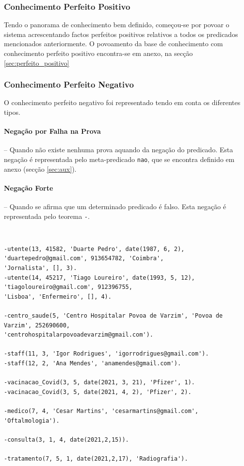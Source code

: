 \documentclass[a4paper, 11pt]{article}
\begin{document}
\subsubsection{Conhecimento Perfeito Positivo}

Tendo o panorama de conhecimento bem definido, começou-se por povoar o sistema acrescentando 
factos perfeitos positivos relativos a todos os predicados mencionados anteriormente. O povoamento 
da base de conhecimento com conhecimento perfeito positivo encontra-se em anexo, na secção 
\ref{sec:perfeito_positivo}

\subsubsection{Conhecimento Perfeito Negativo}

O conhecimento perfeito negativo foi representado tendo em
conta os diferentes tipos.

\paragraph{Negação por Falha na Prova} -- Quando não existe nenhuma prova aquando da negação 
do predicado. Esta negação é representada pelo meta-predicado \texttt{nao}, que se
encontra definido em anexo (secção \ref{sec:aux}).

\paragraph{Negação Forte} -- Quando se afirma que um determinado predicado é falso. Esta 
negação é representada pelo teorema \texttt{-}. 

\

\begin{lstlisting}[caption={Povoamento da base de conhecimento com conhecimento perfeito negativo}]
-utente(13, 41582, 'Duarte Pedro', date(1987, 6, 2), 'duartepedro@gmail.com', 913654782, 'Coimbra', 
'Jornalista', [], 3).
-utente(14, 45217, 'Tiago Loureiro', date(1993, 5, 12), 'tiagoloureiro@gmail.com', 912396755, 
'Lisboa', 'Enfermeiro', [], 4).

-centro_saude(5, 'Centro Hospitalar Povoa de Varzim', 'Povoa de Varzim', 252690600, 
'centrohospitalarpovoadevarzim@gmail.com').

-staff(11, 3, 'Igor Rodrigues', 'igorrodrigues@gmail.com').
-staff(12, 2, 'Ana Mendes', 'anamendes@gmail.com').

-vacinacao_Covid(3, 5, date(2021, 3, 21), 'Pfizer', 1).
-vacinacao_Covid(3, 5, date(2021, 4, 2), 'Pfizer', 2).

-medico(7, 4, 'Cesar Martins', 'cesarmartins@gmail.com', 'Oftalmologia').

-consulta(3, 1, 4, date(2021,2,15)).

-tratamento(7, 5, 1, date(2021,2,17), 'Radiografia').
\end{lstlisting}
\end{document}
